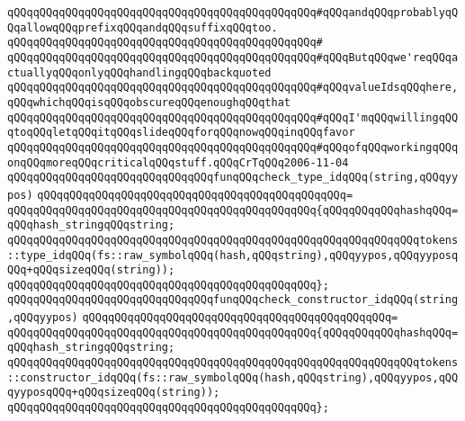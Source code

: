 \verb|qQQqqQQqqQQqqQQqqQQqqQQqqQQqqQQqqQQqqQQqqQQqqQQq#qQQqandqQQqprobablyqQQqallowqQQqprefixqQQqandqQQqsuffixqQQqtoo.|\newline
\verb|qQQqqQQqqQQqqQQqqQQqqQQqqQQqqQQqqQQqqQQqqQQqqQQq#|\newline
\verb|qQQqqQQqqQQqqQQqqQQqqQQqqQQqqQQqqQQqqQQqqQQqqQQq#qQQqButqQQqwe'reqQQqactuallyqQQqonlyqQQqhandlingqQQqbackquoted|\newline
\verb|qQQqqQQqqQQqqQQqqQQqqQQqqQQqqQQqqQQqqQQqqQQqqQQq#qQQqvalueIdsqQQqhere,qQQqwhichqQQqisqQQqobscureqQQqenoughqQQqthat|\newline
\verb|qQQqqQQqqQQqqQQqqQQqqQQqqQQqqQQqqQQqqQQqqQQqqQQq#qQQqI'mqQQqwillingqQQqtoqQQqletqQQqitqQQqslideqQQqforqQQqnowqQQqinqQQqfavor|\newline
\verb|qQQqqQQqqQQqqQQqqQQqqQQqqQQqqQQqqQQqqQQqqQQqqQQq#qQQqofqQQqworkingqQQqonqQQqmoreqQQqcriticalqQQqstuff.qQQqCrTqQQq2006-11-04|\newline
\newline
\newline
\verb|qQQqqQQqqQQqqQQqqQQqqQQqqQQqqQQqfunqQQqcheck_type_idqQQq(string,qQQqyypos)|\newline
\verb|qQQqqQQqqQQqqQQqqQQqqQQqqQQqqQQqqQQqqQQqqQQqqQQq=|\newline
\verb|qQQqqQQqqQQqqQQqqQQqqQQqqQQqqQQqqQQqqQQqqQQqqQQq{qQQqqQQqqQQqhashqQQq=qQQqhash_stringqQQqstring;|\newline
\newline
\verb|qQQqqQQqqQQqqQQqqQQqqQQqqQQqqQQqqQQqqQQqqQQqqQQqqQQqqQQqqQQqqQQqtokens::type_idqQQq(fs::raw_symbolqQQq(hash,qQQqstring),qQQqyypos,qQQqyyposqQQq+qQQqsizeqQQq(string));|\newline
\verb|qQQqqQQqqQQqqQQqqQQqqQQqqQQqqQQqqQQqqQQqqQQqqQQq};|\newline
\newline
\verb|qQQqqQQqqQQqqQQqqQQqqQQqqQQqqQQqfunqQQqcheck_constructor_idqQQq(string,qQQqyypos)|\newline
\verb|qQQqqQQqqQQqqQQqqQQqqQQqqQQqqQQqqQQqqQQqqQQqqQQq=|\newline
\verb|qQQqqQQqqQQqqQQqqQQqqQQqqQQqqQQqqQQqqQQqqQQqqQQq{qQQqqQQqqQQqhashqQQq=qQQqhash_stringqQQqstring;|\newline
\newline
\verb|qQQqqQQqqQQqqQQqqQQqqQQqqQQqqQQqqQQqqQQqqQQqqQQqqQQqqQQqqQQqqQQqtokens::constructor_idqQQq(fs::raw_symbolqQQq(hash,qQQqstring),qQQqyypos,qQQqyyposqQQq+qQQqsizeqQQq(string));|\newline
\verb|qQQqqQQqqQQqqQQqqQQqqQQqqQQqqQQqqQQqqQQqqQQqqQQq};|\newline
